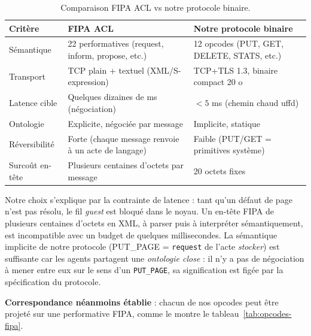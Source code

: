 \begin{table}[H]
\centering
\small
\caption{Comparaison FIPA ACL vs notre protocole binaire.}
\begin{tabular}{p{4cm}p{4.5cm}p{4.5cm}}
\toprule
\textbf{Critère} & \textbf{FIPA ACL} & \textbf{Notre protocole binaire} \\
\midrule
Sémantique         & 22 performatives (request, inform, propose, etc.)   & 12 opcodes (PUT, GET, DELETE, STATS, etc.) \\
Transport          & TCP plain + textuel (XML/S-expression)              & TCP+TLS 1.3, binaire compact 20 o \\
Latence cible      & Quelques dizaines de ms (négociation)                & $< 5$ ms (chemin chaud uffd) \\
Ontologie          & Explicite, négociée par message                      & Implicite, statique \\
Réversibilité      & Forte (chaque message renvoie à un acte de langage)  & Faible (PUT/GET = primitives système) \\
Surcoût en-tête    & Plusieurs centaines d'octets par message             & 20 octets fixes \\
\bottomrule
\end{tabular}

\label{tab:fipa-vs-omega}
\end{table}

Notre choix s'explique par la contrainte de latence : tant qu'un défaut de page n'est pas résolu, le fil \emph{guest} est bloqué dans le noyau. Un en-tête FIPA de plusieurs centaines d'octets en XML, à parser puis à interpréter sémantiquement, est incompatible avec un budget de quelques millisecondes. La sémantique implicite de notre protocole (\og{}PUT\_PAGE = \texttt{request} de l'acte \emph{stocker}\fg{}) est suffisante car les agents partagent une \emph{ontologie close} : il n'y a pas de négociation à mener entre eux sur le sens d'un \texttt{PUT\_PAGE}, sa signification est figée par la spécification du protocole.

\textbf{Correspondance néanmoins établie} : chacun de nos opcodes peut être projeté sur une performative FIPA, comme le montre le tableau~\ref{tab:opcodes-fipa}.

